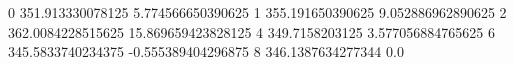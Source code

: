 0 351.913330078125 5.774566650390625
1 355.191650390625 9.052886962890625
2 362.0084228515625 15.869659423828125
4 349.7158203125 3.577056884765625
6 345.5833740234375 -0.555389404296875
8 346.1387634277344 0.0
